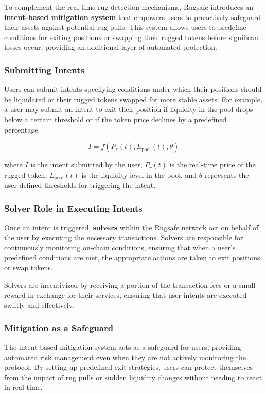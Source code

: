 \documentclass{article}
\begin{document}
To complement the real-time rug detection mechanisms, Rugsafe introduces an \textbf{intent-based mitigation system} that empowers users to proactively safeguard their assets against potential rug pulls. This system allows users to predefine conditions for exiting positions or swapping their rugged tokens before significant losses occur, providing an additional layer of automated protection.

\subsubsection{Submitting Intents}

Users can submit intents specifying conditions under which their positions should be liquidated or their rugged tokens swapped for more stable assets. For example, a user may submit an intent to exit their position if liquidity in the pool drops below a certain threshold or if the token price declines by a predefined percentage.

\[
I = f\left( P_{r}(t), L_{\text{pool}}(t), \theta \right)
\]

where \( I \) is the intent submitted by the user, \( P_{r}(t) \) is the real-time price of the rugged token, \( L_{\text{pool}}(t) \) is the liquidity level in the pool, and \( \theta \) represents the user-defined thresholds for triggering the intent.

\subsubsection{Solver Role in Executing Intents}

Once an intent is triggered, \textbf{solvers} within the Rugsafe network act on behalf of the user by executing the necessary transactions. Solvers are responsible for continuously monitoring on-chain conditions, ensuring that when a user's predefined conditions are met, the appropriate actions are taken to exit positions or swap tokens.

Solvers are incentivized by receiving a portion of the transaction fees or a small reward in exchange for their services, ensuring that user intents are executed swiftly and effectively.

\subsubsection{Mitigation as a Safeguard}

The intent-based mitigation system acts as a safeguard for users, providing automated risk management even when they are not actively monitoring the protocol. By setting up predefined exit strategies, users can protect themselves from the impact of rug pulls or sudden liquidity changes without needing to react in real-time.
\end{document}
